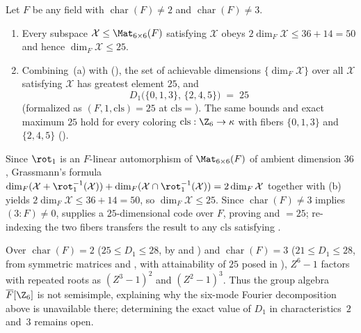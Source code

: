 \begin{theorem}\label{thm:aperiodic-six-25}
Let $F$ be any field with $\operatorname{char}(F) \ne 2$ and $\operatorname{char}(F) \ne 3$.
\begin{enumerate}[label=(\alph*)]
\item Every subspace $\mathcal{X} \le \Mat_{6\times 6}(F)$ satisfying
    $\mathcal{X}$ obeys
  $2\dim_F \mathcal{X} \le 36 + 14 = 50$ and hence $\dim_F \mathcal{X} \le 25$.
\item Combining~(a) with \cite[Theorem~3.2]{ClassUniformMemo2026}
  (), the set of achievable dimensions
  $\{\dim_F \mathcal{X}\}$ over all $\mathcal{X}$ satisfying
    $\mathcal{X}$
  has greatest element $25$, and
  \[
    D_1\bigl(\{0,1,3\},\,\{2,4,5\}\bigr) \;=\; 25
  \]
  (formalized as $(F, 1, \mathrm{cls}) = 25$ at
  $\mathrm{cls} = {}$).
  The same bounds and exact maximum $25$ hold for every coloring $\mathrm{cls} : \Z_6 \to \kappa$ with
  fibers $\{0,1,3\}$ and $\{2,4,5\}$ ().
\end{enumerate}
\end{theorem}
\begin{outline}
Since $\rot_1$ is an $F$-linear automorphism of $\Mat_{6\times 6}(F)$ of ambient dimension $36$,
Grassmann's formula $\dim_F(\mathcal{X} + \rot_1^{-1}(\mathcal{X})) +
\dim_F(\mathcal{X} \cap \rot_1^{-1}(\mathcal{X})) = 2\dim_F \mathcal{X}$ together with
(b) yields $2\dim_F \mathcal{X} \le 36 + 14 = 50$, so
$\dim_F \mathcal{X} \le 25$. Since $\operatorname{char}(F) \ne 3$ implies $(3 : F) \ne 0$,
 supplies a $25$-dimensional code over $F$,
proving  and ${} = 25$; re-indexing the two fibers
transfers the result to any $\mathrm{cls}$ satisfying .
\end{outline}

\begin{remark}\label{rem:aperiodic-six-chars}
Over $\operatorname{char}(F) = 2$ ($25 \le D_1 \le 28$, by
\cite[Theorem~6.4 and Proposition~8.2]{SeventeenthPaper2026} and
\cite[Theorem~3.2]{ClassUniformMemo2026}) and $\operatorname{char}(F) = 3$ ($21 \le D_1 \le 28$, from
symmetric matrices and \cite[Theorem~6.4]{SeventeenthPaper2026}, with attainability of $25$ posed in
\cite[Problem~6.1]{ClassUniformMemo2026}), $Z^6 - 1$ factors with repeated roots as $(Z^3 - 1)^2$ and
$(Z^2 - 1)^3$. Thus the group algebra $\overline{F}[\Z_6]$ is not semisimple, explaining why the
six-mode Fourier decomposition above is unavailable there; determining the exact value of $D_1$ in
characteristics~$2$ and~$3$ remains open.
\end{remark}
